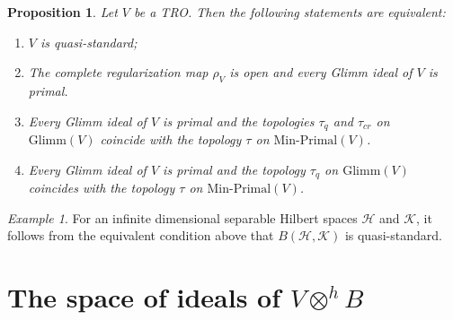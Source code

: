 \documentclass{birkjour}
\newtheorem{prop}[thm]{Proposition}
\theoremstyle{definition}
\theoremstyle{remark}
\newtheorem*{ex}{Example}
\numberwithin{equation}{section}
\begin{document}
\begin{prop}
 



Let \( V\) be a TRO. Then the  following  statements are equivalent:

\begin{enumerate}
    \item[(i)] \( V \) is quasi-standard;
    \item[(ii)] The complete regularization map \( \rho_V\) is open and every Glimm ideal of \( V \) is primal.
    \item[(iii)] Every Glimm ideal of \( V\) is primal and the topologies \( \tau_q \) and \( \tau_{cr} \) on \( \mathrm{Glimm}(V)\) coincide with the topology \( \tau \) on \( \mathrm{Min\text{-}Primal}(V) \).
    \item[(iv)] Every Glimm ideal of \( V \) is primal and the topology \( \tau_q \) on \( \mathrm{Glimm}(V) \) coincides with the topology \( \tau \) on \( \mathrm{Min\text{-}Primal}(V) \).
\end{enumerate}

   
\end{prop}

\begin{ex}
 
For an infinite dimensional separable Hilbert spaces $\mathcal{H}$ and $\mathcal{K}$,  it follows from the equivalent condition above that $B(\mathcal{H},\mathcal{K})$ is quasi-standard.
   
\end{ex}












































\section{The space of ideals of $V \otimes^h B$}
\end{document}
